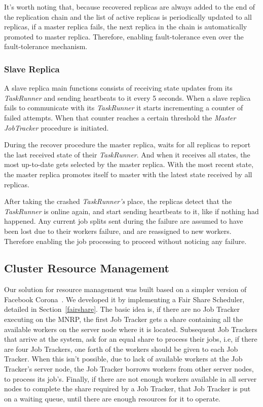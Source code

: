 \documentclass[times, 10pt,twocolumn]{article}
\begin{document}
            It's worth noting that, because recovered replicas are always added to the end of the replication chain and the list of active replicas is periodically updated to all replicas, if a master replica fails, the next replica in the chain is automatically promoted to master replica. Therefore, enabling fault-tolerance even over the fault-tolerance mechanism.
        	
        	\subsubsection{Slave Replica}\label{slave-replica}
            
            A slave replica main functions consists of receiving state updates from its \textit{TaskRunner} and sending heartbeats to it every 5 seconds. When a slave replica fails to communicate with its \textit{TaskRunner} it starts incrementing a counter of failed attempts. When that counter reaches a certain threshold the \textit{Master JobTracker} procedure is initiated.
            
            During the recover procedure the master replica, waits for all replicas to report the last received state of their \textit{TaskRunner}. And when it receives all states, the most up-to-date gets selected by the master replica. With the most recent state, the master replica promotes itself to master with the latest state received by all replicas.
            
            After taking the crashed \textit{TaskRunner's} place, the replicas detect that the \textit{TaskRunner} is online again, and start sending heartbeats to it, like if nothing had happened. Any current job splits sent during the failure are assumed to have been lost due to their workers failure, and are reassigned to new workers. Therefore enabling the job processing to proceed without noticing any failure.
    	
    	\subsection{Cluster Resource Management} \label{cluster-man}
            Our solution for resource management was built based on a simpler version of Facebook Corona~\cite{Facebook2012}.
            We developed it by implementing a Fair Share Scheduler, detailed in Section~\ref{fairshare}. The basic idea is,
            if there are no Job Tracker executing on the \ac{MNRP}, the first Job Tracker gets a share containing all the available workers on
            the server node where it is located. Subsequent Job Trackers that arrive at the system, ask for an equal share to process their jobs,
            i.e, if there are four Job Trackers, one forth of the workers should be given to each Job Tracker. When this isn't possible, due to lack
            of available workers at the Job Tracker's server node, the Job Tracker borrows workers from other server nodes, to process its job's.
            Finally, if there are not enough workers available in all server nodes to complete the share required by a Job Tracker, that Job Tracker is put
            on a waiting queue, until there are enough resources for it to operate.
        
\end{document}
